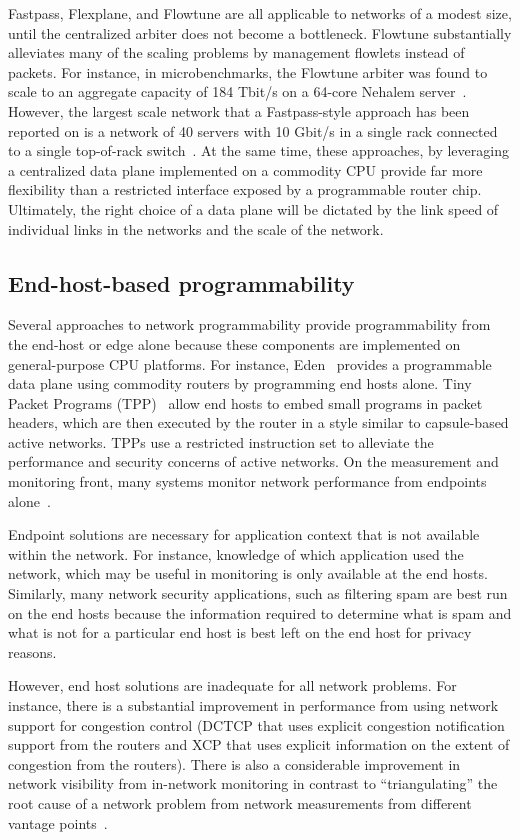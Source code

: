 Fastpass, Flexplane, and Flowtune are all applicable to networks of a modest
size, until the centralized arbiter does not become a bottleneck. Flowtune
substantially alleviates many of the scaling problems by management flowlets
instead of packets. For instance, in microbenchmarks, the Flowtune arbiter was
found to scale to an aggregate capacity of 184 Tbit/s on a 64-core Nehalem
server~\cite{flowtune}. However, the largest scale network that a
Fastpass-style approach has been reported on is a network of 40 servers with 10
Gbit/s in a single rack connected to a single top-of-rack
switch~\cite{flexplane}. At the same time, these approaches, by leveraging a
centralized data plane implemented on a commodity CPU provide far more
flexibility than a restricted interface exposed by a programmable router chip.
Ultimately, the right choice of a data plane will be dictated by the link speed
of individual links in the networks and the scale of the network.

\subsection{End-host-based programmability}
Several approaches to network programmability provide programmability from the
end-host or edge alone because these components are implemented on
general-purpose CPU platforms. For instance, Eden~\cite{eden} provides a
programmable data plane using commodity routers by programming end hosts alone.
Tiny Packet Programs (TPP)~\cite{tpp} allow end hosts to embed small programs
in packet headers, which are then executed by the router in a style similar to
capsule-based active networks. TPPs use a restricted instruction set to
alleviate the performance and security concerns of active networks. On the
measurement and monitoring front, many systems monitor network performance from
endpoints alone~\cite{netpoirot, minlan-snap, dapper-sosr, trumpet,
azure-smartnic}.

Endpoint solutions are necessary for application context that is not available
within the network. For instance, knowledge of which application used the
network, which may be useful in monitoring is only available at the end hosts.
Similarly, many network security applications, such as filtering spam are best
run on the end hosts because the information required to determine what is spam
and what is not for a particular end host is best left on the end host for
privacy reasons.

However, end host solutions are inadequate for all network problems. For
instance, there is a substantial improvement in performance from using network
support for congestion control (\eg DCTCP that uses explicit congestion
notification support from the routers and XCP that uses explicit information
on the extent of congestion from the routers). There is also a considerable
improvement in network visibility from in-network monitoring in contrast to
``triangulating'' the root cause of a network problem from network measurements
from different vantage points~\cite{pingmesh}.

